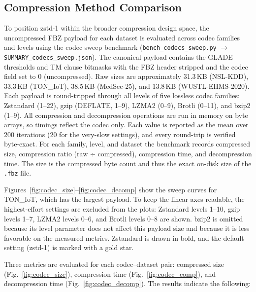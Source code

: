 \documentclass[journal,twoside,web]{ieeecolor}
\begin{document}
\subsection{Compression Method Comparison}
\label{sec:res-codecs}

To position zstd-1 within the broader compression design space, the
uncompressed FBZ payload for each dataset is evaluated across
codec families and levels using the codec sweep benchmark
(\texttt{bench\_codecs\_sweep.py} $\rightarrow$
\texttt{SUMMARY\_codecs\_sweep.json}). The canonical payload contains
the GLADE thresholds and TM clause bitmasks with the FBZ header
stripped and the codec field set to 0 (uncompressed). Raw sizes are
approximately 31.3\,KB (NSL-KDD), 33.3\,KB (TON\_IoT), 38.5\,KB
(MedSec-25), and 13.8\,KB (WUSTL-EHMS-2020). Each payload is
round-tripped through all levels of five lossless codec families:
Zstandard (1--22), gzip (DEFLATE, 1--9), LZMA2 (0--9), Brotli (0--11),
and bzip2 (1--9). All compression and decompression operations are run
in memory on byte arrays, so timings reflect the codec only. Each
value is reported as the mean over 200 iterations (20 for the very-slow
settings), and every round-trip is verified byte-exact. For each
family, level, and dataset the benchmark records compressed size,
compression ratio (raw $\div$ compressed), compression time, and
decompression time. The size is the compressed byte count and thus
the exact on-disk size of the \texttt{.fbz} file.

Figures~\ref{fig:codec_size}--\ref{fig:codec_decomp} show the sweep
curves for TON\_IoT, which has the largest payload. To keep the linear
axes readable, the highest-effort settings are excluded from the plots:
Zstandard levels 1--10, gzip levels 1--7, LZMA2 levels 0--6, and
Brotli levels 0--8 are shown. bzip2 is omitted because its level
parameter does not affect this payload size and because it is less
favorable on the measured metrics. Zstandard is drawn in bold, and the
default setting (zstd-1) is marked with a gold star.

Three metrics are evaluated for each codec--dataset pair:
compressed size (Fig.~\ref{fig:codec_size}), compression time
(Fig.~\ref{fig:codec_comp}), and decompression time
(Fig.~\ref{fig:codec_decomp}). The results indicate the following:
\end{document}
